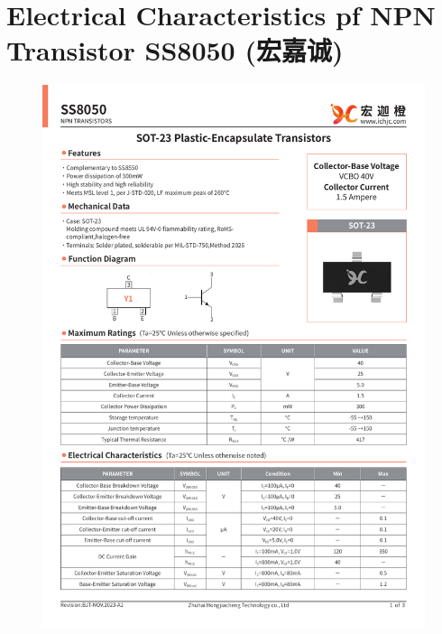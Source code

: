 \documentclass[UTF8]{article}
\begin{document}
\section{Electrical Characteristics pf NPN Transistor SS8050 (宏嘉诚)}

\vspace*{-6mm}
\begin{figure}[H]\centering
    \includegraphics[width=\columnwidth]{preview/assets/SS8050_1.pdf}

\end{figure}
\end{document}
